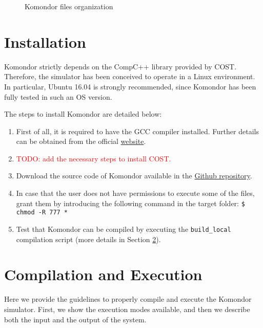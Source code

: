 \documentclass[a4paper]{article}
\begin{document}
	\begin{figure}[h!]
		\centering
		\caption{Komondor files organization}
		\label{fig:komondor_files}
	\end{figure}	

\section{Installation}

Komondor strictly depends on the CompC++ library provided by COST. Therefore, the simulator has been conceived to operate in a Linux environment. In particular, Ubuntu 16.04 is strongly recommended, since Komondor has been fully tested in such an OS version. 

The steps to install Komondor are detailed below:
\begin{enumerate}
	\item First of all, it is required to have the GCC compiler installed. Further details can be obtained from the official \href{http://gcc.gnu.org/install/}{website}.
	\item \textcolor{red}{TODO: add the necessary steps to install COST.}
	\item Download the source code of Komondor available in the \href{https://github.com/wn-upf/Komondor/tree/master/Code}{Github repository}.
	\item In case that the user does not have permissions to execute some of the files, grant them by introducing the following command in the target folder: \texttt{\$ chmod -R 777 *}
	\item Test that Komondor can be compiled by executing the \texttt{build\_local} compilation script (more details in Section \ref{section:execution}).
 \end{enumerate}

\section{Compilation and Execution}
\label{section:execution}
Here we provide the guidelines to properly compile and execute the Komondor simulator. First, we show the execution modes available, and then we describe both the input and the output of the system.

\end{document}
